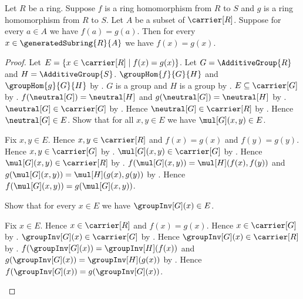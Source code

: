 \begin{theorem}\label{ring_hom_agreement_on_generated_subring}
    Let $R$ be a ring.
    Suppose $f$ is a ring homomorphism from $R$ to $S$ and
        $g$ is a ring homomorphism from $R$ to $S$.
    Let $A$ be a subset of $\carrier[R]$.
    Suppose for every $a\in A$ we have $f(a)=g(a)$.
    Then for every $x\in\generatedSubring{R}{A}$ we have $f(x)=g(x)$.
\end{theorem}
\begin{proof}
    Let $E=\{x\in\carrier[R]\mid f(x)=g(x)\}$.
    Let $G=\AdditiveGroup{R}$ and $H=\AdditiveGroup{S}$.
    $\groupHom{f}{G}{H}$ and $\groupHom{g}{G}{H}$ by
        .
    $G$ is a group and $H$ is a group by
        .
    $E\subseteq\carrier[G]$ by
        .
    $f(\neutral[G])=\neutral[H]$ and
        $g(\neutral[G])=\neutral[H]$ by .
    $\neutral[G]\in\carrier[G]$ by
        .
    Hence $\neutral[G]\in\carrier[R]$ by
        .
    Hence $\neutral[G]\in E$.
    Show that for all $x,y\in E$ we have $\mul[G](x,y)\in E$.
    \begin{subproof}
        Fix $x,y\in E$.
        Hence $x,y\in\carrier[R]$ and
            $f(x)=g(x)$ and $f(y)=g(y)$.
        Hence $x,y\in\carrier[G]$ by .
        $\mul[G](x,y)\in\carrier[G]$ by
            .
        Hence $\mul[G](x,y)\in\carrier[R]$ by
            .
        $f(\mul[G](x,y))=\mul[H](f(x),f(y))$ and
            $g(\mul[G](x,y))=\mul[H](g(x),g(y))$ by
            .
        Hence $f(\mul[G](x,y))=g(\mul[G](x,y))$.
    \end{subproof}
    Show that for every $x\in E$ we have $\groupInv[G](x)\in E$.
    \begin{subproof}
        Fix $x\in E$.
        Hence $x\in\carrier[R]$ and $f(x)=g(x)$.
        Hence $x\in\carrier[G]$ by .
        $\groupInv[G](x)\in\carrier[G]$ by
            .
        Hence $\groupInv[G](x)\in\carrier[R]$ by
            .
        $f(\groupInv[G](x))=\groupInv[H](f(x))$ and
            $g(\groupInv[G](x))=\groupInv[H](g(x))$ by
            .
        Hence $f(\groupInv[G](x))=g(\groupInv[G](x))$.
    \end{subproof}

\end{proof}
